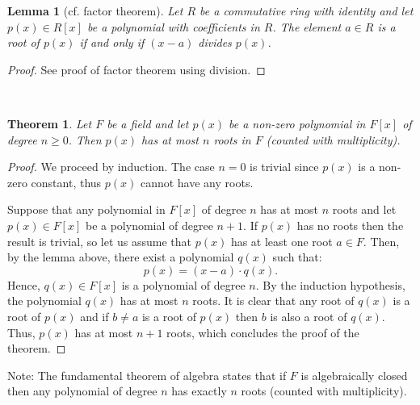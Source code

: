 \documentclass[12pt]{article}
\newtheorem*{thm}{Theorem}
\newtheorem*{lemma}{Lemma}
\theoremstyle{definition}
\begin{document}
\begin{lemma}[cf. factor theorem]
Let $R$ be a commutative ring with identity and let $p(x)\in R[x]$ be a polynomial with coefficients in $R$. The element $a\in R$ is a root of $p(x)$ if and only if $(x-a)$ divides $p(x)$.
\end{lemma}
\begin{proof}
See proof of factor theorem using division.
\end{proof}
\ \\
\begin{thm}
Let $F$ be a field and let $p(x)$ be a non-zero polynomial in $F[x]$ of degree $n\geq 0$. Then $p(x)$ has at most $n$ roots in $F$ (counted with multiplicity).
\end{thm}

\begin{proof}
We proceed by induction. The case $n=0$ is trivial since $p(x)$ is a non-zero constant, thus $p(x)$ cannot have any roots.

Suppose that any polynomial in $F[x]$ of degree $n$ has at most $n$ roots and let $p(x)\in F[x]$ be a polynomial of degree $n+1$. If $p(x)$ has no roots then the result is trivial, so let us assume that $p(x)$ has at least one root $a\in F$. Then, by the lemma above, there exist a polynomial $q(x)$ such that:
$$p(x)=(x-a)\cdot q(x).$$
Hence, $q(x)\in F[x]$ is a polynomial of degree $n$. By the induction hypothesis, the polynomial $q(x)$ has at most $n$ roots. It is clear that any root of $q(x)$ is a root of $p(x)$ and if $b\neq a$ is a root of $p(x)$ then $b$ is also a root of $q(x)$. Thus, $p(x)$ has at most $n+1$ roots, which concludes the proof of the theorem.
\end{proof}

Note: The fundamental theorem of algebra states that if $F$ is algebraically closed then any polynomial of degree $n$ has exactly $n$ roots (counted with multiplicity).
\end{document}
